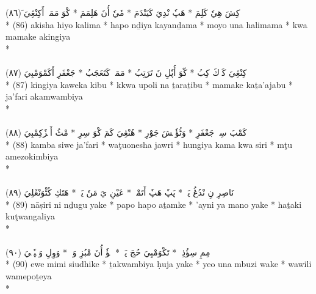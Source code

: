 \documentclass[a4paper, 12pt]{report}
\begin{document}
\begin{center}
\textarabic{(٨٦) \textcolor{mygreen}{َكِشَ هِيٗ كَلِمَ  * هَپٗ نْدِيَ كَيَنْدَمَ  * مٗيٗ أُنَ هَلِمَمَ  * كْوَ مَمَكٖ أَكِنْڠِيَ }} \\* 
(86) akisha hiyo kalima  * hapo nḏiya kayanḏama  * moyo una halimama  * kwa mamake akingiya  \\* 
 \\ 
\\[8mm] 

\textarabic{(٨٧) \textcolor{mygreen}{كِنْڠِيَ كَوٖكَ كِبُ  * كّوَ أُپٗلِ نَ تَرَتِبُ  * مَمَكٖ كَتَعَجَبُ  * جَعْفَرِ أَكَمْوَمْبِيَ }} \\* 
(87) kingiya kaweka kibu  * kkwa upoli na ṯaraṯibu  * mamake kaṯa'ajabu  * ja'fari akamwambiya  \\* 
 \\ 
\\[8mm] 

\textarabic{(٨٨) \textcolor{mygreen}{كَمْبَ سِوٖ جَعْفَرِ  * وَٹُؤٗنٖشَ جَوْرِ  * هُنْڠِيَ كَمَ كْوَ سِرِ  * مْٹُ أَمٖزٗكِمْبِيَ }} \\* 
(88) kamba siwe ja'fari  * waţuonesha jawri  * hungiya kama kwa siri  * mţu amezokimbiya  \\* 
 \\ 
\\[8mm] 

\textarabic{(٨٩) \textcolor{mygreen}{نَاصِرِ نِ نْدُڠُ يَكٖ  * پَپٗ هَپٗ أَتَمْكٖ  * عَيْنِ يَ مَنٗ يَكٖ  * هَتَكِ كُٹْوَنْڠَلِيَ }} \\* 
(89) nāṣiri ni nḏugu yake  * papo hapo aṯamke  * 'ayni ya mano yake  * haṯaki kuţwangaliya  \\* 
 \\ 
\\[8mm] 

\textarabic{(٩٠) \textcolor{mygreen}{إٖوٖ مِمِ سِؤُذِكٖ  * تَكْوَمْبِيَ حُجَ يَكٖ  * يٖؤٗ أُنَ مْبُزِ وَكٖ  * وَوِلِ وَمٖپٗتٖيَ }} \\* 
(90) ewe mimi siudhike  * ṯakwambiya ḥuja yake  * yeo una mbuzi wake  * wawili wamepoṯeya  \\* 
 \\ 
\\[8mm] 


\end{center}
\end{document}
